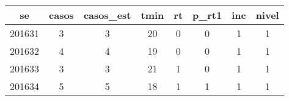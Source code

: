 \begin{tabular}{c|ccccccc}
  \hline
se & casos & casos\_est & tmin & rt & p\_rt1 & inc & nivel \\ 
  \hline
201631 & 3 & 3 & 20 & 0 & 0 & 1 & 1 \\ 
  201632 & 4 & 4 & 19 & 0 & 0 & 1 & 1 \\ 
  201633 & 3 & 3 & 21 & 1 & 0 & 1 & 1 \\ 
  201634 & 5 & 5 & 18 & 1 & 1 & 1 & 1 \\ 
   \hline
\end{tabular}
